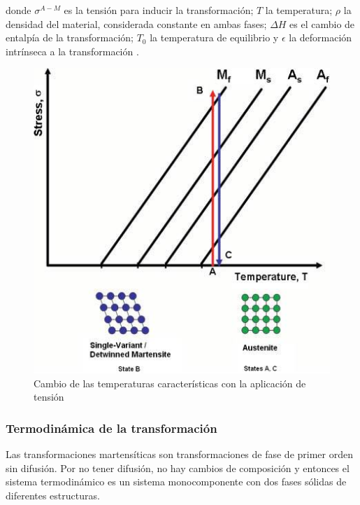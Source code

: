 \documentclass[12pt]{article}
\theoremstyle{definition}
\theoremstyle{remark}
\begin{document}
donde $\sigma^{A-M}$ es la tensión para inducir la transformación; $T$ la temperatura; $\rho$ la densidad del material, considerada constante en ambas fases; $\Delta H$ es el cambio de entalpía de la transformación; $T_0$ la temperatura de equilibrio y $\epsilon$ la deformación intrínseca a la transformación \cite{Malvasio}.

\begin{figure}[H]
	\centering
	\includegraphics[scale=0.4]{img/StressTransformation.png}
	\caption{Cambio de las temperaturas características con la aplicación de tensión}
	\label{TvsS}
\end{figure}

\subsubsection{Termodinámica de la transformación}
Las transformaciones martensíticas son transformaciones de fase de primer orden sin difusión. Por no tener difusión, no hay cambios de composición y entonces el sistema termodinámico es un sistema monocomponente con dos fases sólidas de diferentes estructuras.\cite{Santamarta}
\end{document}
